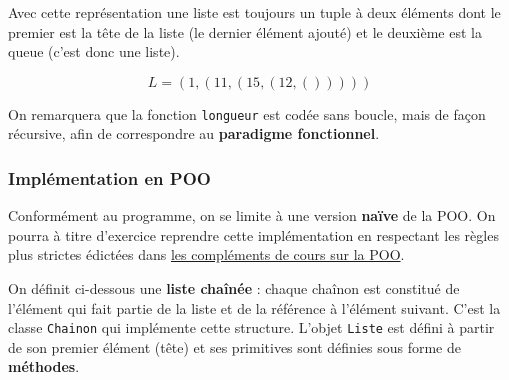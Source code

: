 \documentclass[
  a4paper,
  DIV=11,
  numbers=noendperiod]{scrartcl}
\begin{document}
Avec cette représentation une liste est toujours un tuple à deux
éléments dont le premier est la tête de la liste (le dernier élément
ajouté) et le deuxième est la queue (c'est donc une liste).

\[L=(1, (11, (15, (12, ()))))\]

On remarquera que la fonction \texttt{longueur} est codée sans boucle,
mais de façon récursive, afin de correspondre au \textbf{paradigme
fonctionnel}.

\hypertarget{impluxe9mentation-en-poo}{%
\subsubsection{Implémentation en POO}\label{impluxe9mentation-en-poo}}

Conformément au programme, on se limite à une version \textbf{naïve} de
la POO. On pourra à titre d'exercice reprendre cette implémentation en
respectant les règles plus strictes édictées dans
\href{../langagesProgr/POO_complements.qmd}{les compléments de cours sur
la POO}.

On définit ci-dessous une \textbf{liste chaînée} : chaque chaînon est
constitué de l'élément qui fait partie de la liste et de la référence à
l'élément suivant. C'est la classe \texttt{Chainon} qui implémente cette
structure. L'objet \texttt{Liste} est défini à partir de son premier
élément (tête) et ses primitives sont définies sous forme de
\textbf{méthodes}.
\end{document}
